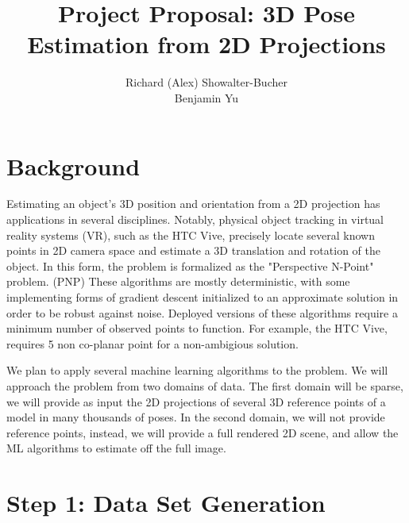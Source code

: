 \documentclass[journal]{IEEEtran}
\begin{document}
%
\title{Project Proposal: 3D Pose Estimation from 2D Projections}
%
%
%

\author{Richard (Alex) Showalter-Bucher\\Benjamin Yu}


\maketitle

\section{Background}
Estimating an object's 3D position and orientation from a 2D projection has applications in several disciplines.
Notably, physical object tracking in virtual reality systems (VR), such as the HTC Vive, precisely locate several
known points in 2D camera space and estimate a 3D translation and rotation of the object. In this form, the
problem is formalized as the "Perspective N-Point" problem. (PNP) These algorithms are mostly deterministic,
with some implementing forms of gradient descent initialized to an approximate solution in order to be robust
against noise. Deployed versions of these algorithms require a minimum number of observed points to function.
For example, the HTC Vive, requires 5 non co-planar point for a non-ambigious solution.

We plan to apply several machine learning algorithms to the problem. We will approach the problem from two
domains of data. The first domain will be sparse, we will provide as input the 2D projections of several 3D reference
points of a model in many thousands of poses. In the second domain, we will not provide reference points, instead,  we
will provide a full rendered 2D scene, and allow the ML algorithms to estimate off the full image.

\section{Step 1: Data Set Generation}
\end{document}
